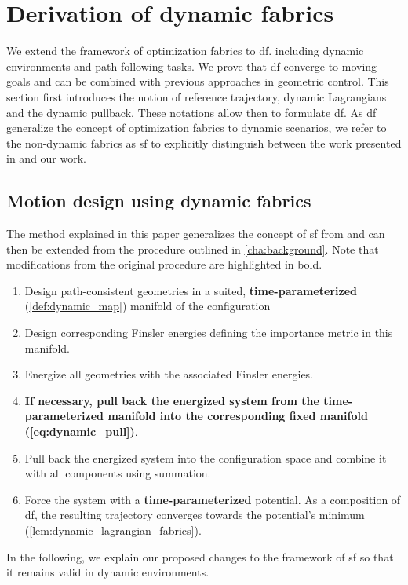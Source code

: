 \section{Derivation of dynamic fabrics}%
\label{sec:tro23_methods}

We extend the framework of optimization fabrics to \acf{df}.
including
dynamic environments and path following tasks. We prove that \ac{df}
converge to moving goals and can be combined with previous approaches in geometric
control.
%
This section first introduces the notion of reference trajectory, dynamic Lagrangians and
the dynamic pullback. These notations allow then to formulate \ac{df}. 
As \ac{df} generalize the concept of optimization fabrics to dynamic scenarios, we refer 
to the non-dynamic fabrics as \acf{sf} to explicitly distinguish between the work
presented in \cite{Ratliff2020} and our work.

\subsection{Motion design using dynamic fabrics}%
\label{sub:motion_design_using_dynamic_fabrics}

The method explained in this paper generalizes the concept of \ac{sf}
from \cite{Ratliff2020} and can then be extended from the procedure outlined in
\cref{cha:background}. Note that modifications from the
original procedure are highlighted in bold.

\begin{enumerate}
  \item Design path\hyp{}consistent geometries in a suited,\newline
    \textbf{time\hyp{}parameterized}
    (\cref{def:dynamic_map}) manifold of the configuration
  \item Design corresponding Finsler energies defining the importance metric in this manifold.
  \item Energize all geometries with the associated Finsler energies.
  \item \textbf{If necessary, pull back the energized system from the time\hyp{}parameterized manifold into
    the corresponding fixed manifold (\cref{eq:dynamic_pull})}.
  \item Pull back the energized system into the configuration space and combine it with
    all components using summation.
  \item Force the system with a \textbf{time\hyp{}parameterized} potential. As a composition of \ac{df}, 
    the resulting trajectory converges towards the potential's minimum (\cref{lem:dynamic_lagrangian_fabrics}).
\end{enumerate}
In the following, we explain our proposed changes to the framework of \ac{sf} so that it remains
valid in dynamic environments.

